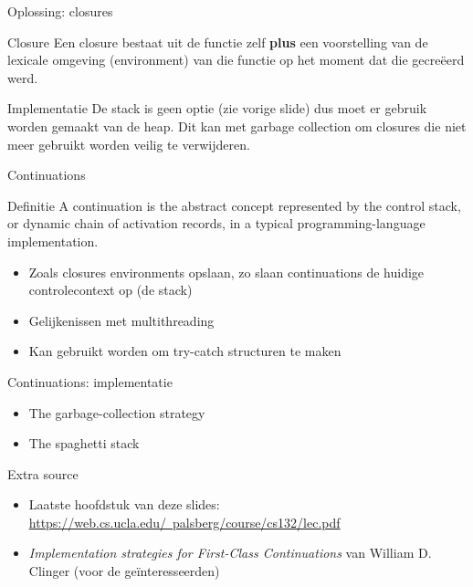 \documentclass{beamer}
\begin{document}
\begin{frame}{Oplossing: closures}
	\begin{block}{Closure}
		Een closure bestaat uit de functie zelf \textbf{plus} een voorstelling van de lexicale omgeving (environment) van die functie op het moment dat die gecreëerd werd.
	\end{block}
	\begin{block}{Implementatie}
		De stack is geen optie (zie vorige slide) dus moet er gebruik worden gemaakt van de heap. Dit kan met garbage collection om closures die niet meer gebruikt worden veilig te verwijderen.
	\end{block}
\end{frame}

\begin{frame}{Continuations}
	\begin{block}{Definitie}
		A continuation is the abstract concept represented by the control stack, or dynamic chain of activation records, in a typical programming-language implementation.
	\end{block}
	\begin{itemize}
		\item Zoals closures environments opslaan, zo slaan continuations de huidige controlecontext op (de stack)
		\item Gelijkenissen met multithreading
		\item Kan gebruikt worden om try-catch structuren te maken
	\end{itemize}
\end{frame}

\begin{frame}{Continuations: implementatie}
	\begin{itemize}
		\item The garbage-collection strategy
		\item The spaghetti stack
	\end{itemize}
\end{frame}

\begin{frame}{Extra source}
\begin{itemize}
    \item Laatste hoofdstuk van deze slides: \href{https://web.cs.ucla.edu/~palsberg/course/cs132/lec.pdf}{https://web.cs.ucla.edu/~palsberg/course/cs132/lec.pdf}
    \item \emph{Implementation strategies for First-Class Continuations} van William D. Clinger (voor de geïnteresseerden)
\end{itemize}
\end{frame}
\end{document}
